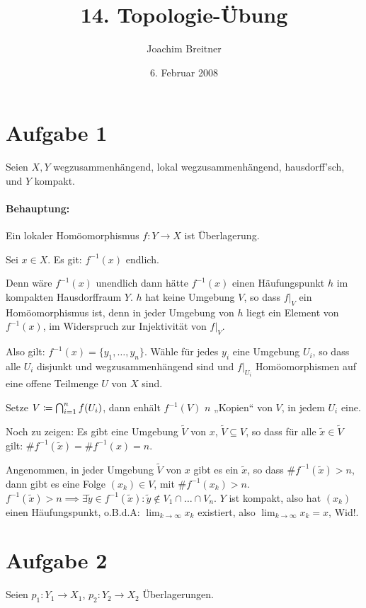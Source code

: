 \documentclass{article}
\title{14. Topologie-Übung}
\author{Joachim Breitner}
\date{6. Februar 2008}
\begin{document}
\maketitle

\section*{Aufgabe 1}

Seien $X, Y$ wegzusammenhängend, lokal wegzusammenhängend, hausdorff’sch, und $Y$ kompakt.

\paragraph{Behauptung:} Ein lokaler Homöomorphismus $f: Y\to X$ ist Überlagerung.

Sei $x\in X$. Es git: $f^{-1}(x)$ endlich.

Denn wäre $f^{-1}(x)$ unendlich dann hätte $f^{-1}(x)$ einen Häufungspunkt $h$ im kompakten Hausdorffraum $Y$. $h$ hat keine Umgebung $V$, so dass $f|_V$ ein Homöomorphismus ist, denn in jeder Umgebung von $h$ liegt ein Element von $f^{-1}(x)$, im Widerspruch zur Injektivität von $f|_V$.

Also gilt: $f^{-1}(x)=\{y_1,\ldots,y_n\}$. Wähle für jedes $y_i$ eine Umgebung $U_i$, so dass alle $U_i$ disjunkt und wegzusammenhängend sind und $f|_{U_i}$ Homöomorphismen auf eine offene Teilmenge $U$ von $X$ sind.

Setze $V\mathrel{\mbox{$\coloneqq$}} \bigcap_{i=1}^n f(U_i)$, dann enhält $f^{-1}(V)$ $n$ „Kopien“ von $V$, in jedem $U_i$ eine.

Noch zu zeigen: Es gibt eine Umgebung $\tilde V$ von $x$, $\tilde V\subseteq V$, so dass für alle $\tilde x\in \tilde V$ gilt: $\#f^{-1}(\tilde x) = \#f^{-1}(x)=n$.

Angenommen, in jeder Umgebung $\tilde V$ von $x$ gibt es ein $\tilde x$, so dass $\#f^{-1}(\tilde x) > n$, dann gibt es eine Folge $(x_k)\in V$, mit $\#f^{-1}(x_k)>n$. $f^{-1}(\tilde x)>n \implies \exists\tilde y\in f^{-1}(\tilde x): \tilde y \notin V_1\cap\ldots\cap V_n$. $Y$ ist kompakt, also hat $(x_k)$ einen Häufungspunkt, o.B.d.A: $\lim_{k\to \infty} x_k$ existiert, also $\lim_{k\to \infty}x_k = x$, Wid!.

\section*{Aufgabe 2}

Seien $p_1:Y_1\to X_1$, $p_2:Y_2\to X_2$ Überlagerungen.
\end{document}
